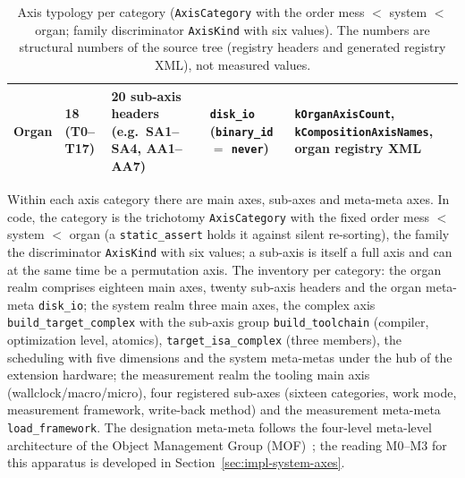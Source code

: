\begin{nurlang}
\begin{table}[htbp]
\begin{tabular}{@{}lp{2.5cm}p{4.15cm}p{2.7cm}p{3.2cm}@{}}
Organ & 18 (T0--T17) & 20 sub-axis headers (e.g.\ SA1--SA4, AA1--AA7) & \texttt{disk\_io} (\texttt{binary\_id} $=$ \texttt{never}) & \texttt{kOrganAxisCount}, \texttt{kComposition\-AxisNames}, organ registry XML \\
\bottomrule
\end{tabular}
\caption{Axis typology per category (\texttt{AxisCategory} with the order mess $<$ system $<$ organ;
family discriminator \texttt{AxisKind} with six values). The numbers are structural numbers of the
source tree (registry headers and generated registry XML), not measured values.}\label{tab:axis-typology}
\end{table}
\end{nurlang}
\begin{nurkurz}
Within each axis category there are main axes, sub-axes and meta-meta axes. In code, the category is
the trichotomy \texttt{AxisCategory} with the fixed order mess $<$ system $<$ organ (a
\texttt{static\_assert} holds it against silent re-sorting), the family the discriminator
\texttt{AxisKind} with six values; a sub-axis is itself a full axis and can at the same time be a
permutation axis. The inventory per category: the organ realm comprises eighteen main axes, twenty
sub-axis headers and the organ meta-meta \texttt{disk\_io}; the system realm three main axes, the
complex axis \texttt{build\_target\_complex} with the sub-axis group \texttt{build\_toolchain}
(compiler, optimization level, atomics), \texttt{target\_isa\_complex} (three members), the scheduling
with five dimensions and the system meta-metas under the hub of the extension hardware; the measurement
realm the tooling main axis (wallclock/macro/micro), four registered sub-axes (sixteen categories, work
mode, measurement framework, write-back method) and the measurement meta-meta \texttt{load\_framework}.
The designation meta-meta follows the four-level meta-level architecture of the Object Management Group
(MOF)~\cite{omg2016mof}; the reading M0--M3 for this apparatus is developed in
Section~\ref{sec:impl-system-axes}.
\end{nurkurz}

